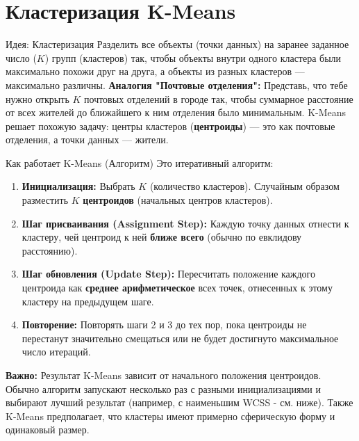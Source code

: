 \section{Кластеризация K-Means}

\begin{myblock}{Идея: Кластеризация}
    Разделить все объекты (точки данных) на заранее заданное число ($K$) групп (кластеров) так, чтобы объекты внутри одного кластера были максимально похожи друг на друга, а объекты из разных кластеров — максимально различны.
    \vspace{0.5ex}
    \textbf{Аналогия "Почтовые отделения":} Представь, что тебе нужно открыть $K$ почтовых отделений в городе так, чтобы суммарное расстояние от всех жителей до ближайшего к ним отделения было минимальным. K-Means решает похожую задачу: центры кластеров (\textbf{центроиды}) — это как почтовые отделения, а точки данных — жители.
\end{myblock}

\begin{textbox}{Как работает K-Means (Алгоритм)}
    Это итеративный алгоритм:
    \begin{enumerate}
        \item \textbf{Инициализация:} Выбрать $K$ (количество кластеров). Случайным образом разместить $K$ \textbf{центроидов} (начальных центров кластеров).
        \item \textbf{Шаг присваивания (Assignment Step):} Каждую точку данных отнести к кластеру, чей центроид к ней \textbf{ближе всего} (обычно по евклидову расстоянию).
        \item \textbf{Шаг обновления (Update Step):} Пересчитать положение каждого центроида как \textbf{среднее арифметическое} всех точек, отнесенных к этому кластеру на предыдущем шаге.
        \item \textbf{Повторение:} Повторять шаги 2 и 3 до тех пор, пока центроиды не перестанут значительно смещаться или не будет достигнуто максимальное число итераций.
    \end{enumerate}
    \textbf{Важно:} Результат K-Means зависит от начального положения центроидов. Обычно алгоритм запускают несколько раз с разными инициализациями и выбирают лучший результат (например, с наименьшим WCSS - см. ниже). Также K-Means предполагает, что кластеры имеют примерно сферическую форму и одинаковый размер.
\end{textbox}

